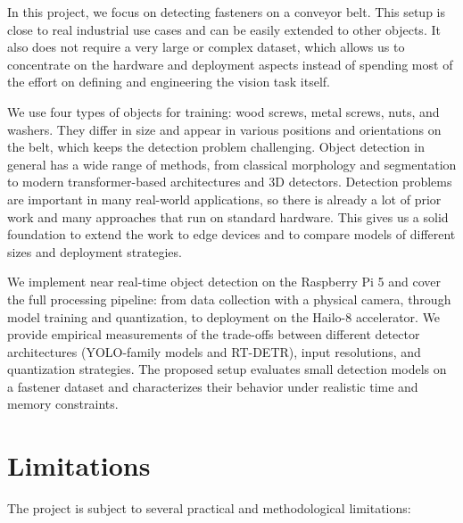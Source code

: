 \documentclass[12pt,a4paper]{report}
\begin{document}
In this project, we focus on detecting fasteners on a conveyor belt. This setup is close to real industrial
use cases and can be easily extended to other objects. It also does not require a very large or complex dataset,
which allows us to concentrate on the hardware and deployment aspects instead of spending most of the effort on
defining and engineering the vision task itself.

We use four types of objects for training: wood screws, metal screws, nuts, and washers. They differ in size and
appear in various positions and orientations on the belt, which keeps the detection problem challenging. Object
detection in general has a wide range of methods, from classical morphology and segmentation to modern transformer-based
architectures and 3D detectors. Detection problems are important in many real-world applications, so there is already a
lot of prior work and many approaches that run on standard hardware. This gives us a solid foundation to extend the work
to edge devices and to compare models of different sizes and deployment strategies.

We implement near real-time object detection on the Raspberry Pi 5 and cover the full processing
pipeline: from data collection with a physical camera, through model training and quantization,
to deployment on the Hailo-8 accelerator. We provide empirical measurements of the trade-offs
between different detector architectures (YOLO-family models and RT-DETR), input resolutions,
and quantization strategies. The proposed setup evaluates small detection models on a fastener
dataset and characterizes their behavior under realistic time and memory constraints.

\section{Limitations}
The project is subject to several practical and methodological limitations:
\end{document}
